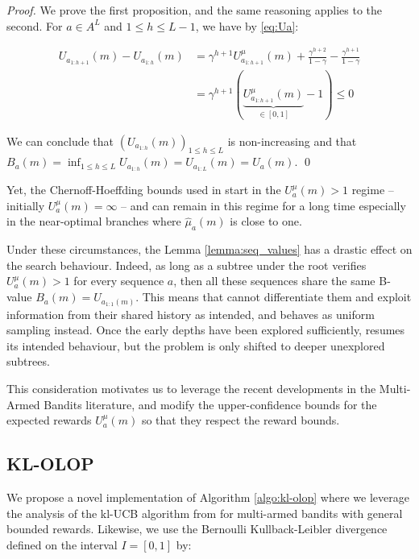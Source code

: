 \documentclass[runningheads]{llncs}
\newcommand{\citep}{\cite}
\begin{document}
\begin{proof}
We prove the first proposition, and the same reasoning applies to the second. For $a\in A^L$ and $1 \leq h \leq L - 1$, we have by \eqref{eq:Ua}:


\begin{align*}
    U_{a_{1:h+1}}(m) - U_{a_{1:h}}(m) &= \gamma^{h+1}U^{\mu}_{a_{1:h+1}}(m) + \frac{\gamma^{h+2}}{1-\gamma} - \frac{\gamma^{h+1}}{1-\gamma}\\
    &= \gamma^{h+1}(\underbrace{U^{\mu}_{a_{1:h+1}}(m)}_{\in [0, 1]} - 1) \leq 0
\end{align*}


\noindent
We can conclude that $(U_{a_{1:h}}(m))_{1\leq h \leq L}$ is non-increasing and that $B_a(m) = \inf_{1 \leq h \leq L} U_{a_{1:h}}(m) = U_{a_{1:L}}(m) = U_a(m)$.
\qed
\end{proof}

Yet, the Chernoff-Hoeffding bounds used in \OLOP start in the $U^{\mu}_a(m) > 1$ regime -- initially $U^{\mu}_a(m) = \infty$ -- and can remain in this regime for a long time especially in the near-optimal branches where $\hat{\mu}_a(m)$ is close to one.

Under these circumstances, the Lemma \ref{lemma:seq_values} has a drastic effect on the search behaviour. Indeed, as long as a subtree under the root verifies $U^{\mu}_a(m) > 1$ for every sequence $a$, then all these sequences share the same B-value $B_a(m) = U_{a_{1:1}(m)}$. This means that \OLOP cannot differentiate them and exploit information from their shared history as intended, and behaves as uniform sampling instead.
Once the early depths have been explored sufficiently, \OLOP resumes its intended behaviour, but the problem is only shifted to deeper unexplored subtrees.
 
 This consideration motivates us to leverage the recent developments in the Multi-Armed Bandits literature, and modify the upper-confidence bounds for the expected rewards $U^\mu_a(m)$ so that they respect the reward bounds.


\subsection{KL-OLOP}
\label{sec:kl-olop-kl-olop}

\noindent
We propose a novel implementation of Algorithm \ref{algo:kl-olop} where we leverage the analysis of the kl-UCB algorithm from \citep{Cappe2013} for multi-armed bandits with general bounded rewards.
Likewise, we use the Bernoulli Kullback-Leibler divergence defined on the interval $I=[0,1]$ by:
\end{document}
